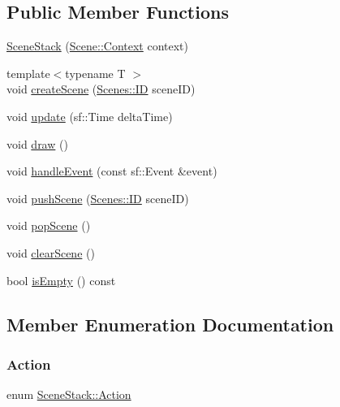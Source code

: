 \subsection*{Public Member Functions}
\begin{DoxyCompactItemize}
\item 
\hyperlink{class_scene_stack_a7893580d1266ed06c9c690012137f799}{Scene\+Stack} (\hyperlink{struct_scene_1_1_context}{Scene\+::\+Context} context)
\item 
{\footnotesize template$<$typename T $>$ }\\void \hyperlink{class_scene_stack_a129b49c7bc280aeaf7c71235b3d9648d}{create\+Scene} (\hyperlink{namespace_scenes_a0ad7ab6856b1d77d498e3a251f6bb275}{Scenes\+::\+ID} scene\+ID)
\item 
void \hyperlink{class_scene_stack_acdea2588bbc85c2834608ebab6671866}{update} (sf\+::\+Time delta\+Time)
\item 
void \hyperlink{class_scene_stack_ab4a68b2247289ba1d934067aad35159d}{draw} ()
\item 
void \hyperlink{class_scene_stack_aecf75add55f527c31528043f4b28db44}{handle\+Event} (const sf\+::\+Event \&event)
\item 
void \hyperlink{class_scene_stack_a41366819a998558e3920fe7859d1f114}{push\+Scene} (\hyperlink{namespace_scenes_a0ad7ab6856b1d77d498e3a251f6bb275}{Scenes\+::\+ID} scene\+ID)
\item 
void \hyperlink{class_scene_stack_a0ea3309f9ec9120cf51a0bce3881e1e2}{pop\+Scene} ()
\item 
void \hyperlink{class_scene_stack_a70253c72c07f5d5c5d77861d064b8470}{clear\+Scene} ()
\item 
bool \hyperlink{class_scene_stack_ade95cce69229a18d169f63093289e865}{is\+Empty} () const
\end{DoxyCompactItemize}


\subsection{Member Enumeration Documentation}
\hypertarget{class_scene_stack_ab8644e038aad992c6776dc3fb5fcc1f9}{}\label{class_scene_stack_ab8644e038aad992c6776dc3fb5fcc1f9} 
\subsubsection{\texorpdfstring{Action}{Action}}
{\footnotesize\ttfamily enum \hyperlink{class_scene_stack_ab8644e038aad992c6776dc3fb5fcc1f9}{Scene\+Stack\+::\+Action}}

